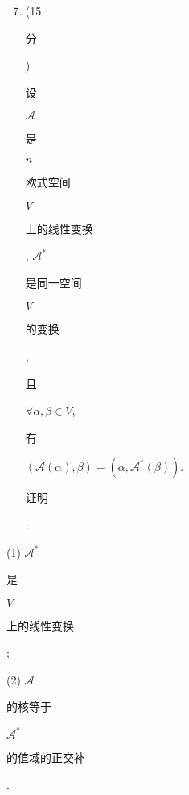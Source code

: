 \documentclass[10pt]{article}
\begin{document}
\begin{enumerate}
  \setcounter{enumi}{6}
  \item (15 \begin{CJK}{UTF8}{mj}分\end{CJK}) \begin{CJK}{UTF8}{mj}设\end{CJK} $\mathscr{A}$ \begin{CJK}{UTF8}{mj}是\end{CJK} $n$ \begin{CJK}{UTF8}{mj}欧式空间\end{CJK} $V$ \begin{CJK}{UTF8}{mj}上的线性变换\end{CJK}, $\mathscr{A}^{*}$ \begin{CJK}{UTF8}{mj}是同一空间\end{CJK} $V$ \begin{CJK}{UTF8}{mj}的变换\end{CJK}, \begin{CJK}{UTF8}{mj}且\end{CJK} $\forall \alpha, \beta \in V$, \begin{CJK}{UTF8}{mj}有\end{CJK} $(\mathscr{A}(\alpha), \beta)=\left(\alpha, \mathscr{A}^{*}(\beta)\right)$. \begin{CJK}{UTF8}{mj}证明\end{CJK}:
\end{enumerate}
(1) $\mathscr{A}^{*}$ \begin{CJK}{UTF8}{mj}是\end{CJK} $V$ \begin{CJK}{UTF8}{mj}上的线性变换\end{CJK};

(2) $\mathscr{A}$ \begin{CJK}{UTF8}{mj}的核等于\end{CJK} $\mathscr{A}^{*}$ \begin{CJK}{UTF8}{mj}的值域的正交补\end{CJK}.
\end{document}
